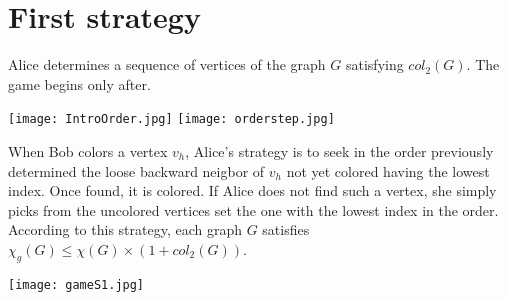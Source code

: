 \section{First strategy}

Alice determines a sequence of vertices of the graph $G$ satisfying $col_{2}(G)$. The game begins only after.

\texttt{[image: IntroOrder.jpg]}
\texttt{[image: orderstep.jpg]}

When Bob colors a vertex $v_{h}$,
Alice's strategy is to seek in the order previously determined the loose backward neigbor of $v_{h}$ not yet
colored having the lowest index. Once found, it is colored. If Alice does not find such a vertex, she simply picks from the uncolored vertices set the one with the lowest index in the order.
According to this strategy, each graph $G$ satisfies $\chi_{g}(G) \leq \chi(G) \times (1 + col_{2}(G))$.

\texttt{[image: gameS1.jpg]}